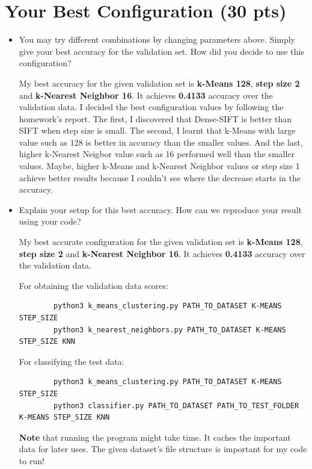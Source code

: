 \documentclass[12pt]{article}
\begin{document}
\section{Your Best Configuration (30 pts)}
    \begin{itemize}
        \item You may try different combinations by changing parameters above. Simply give your best accuracy for the validation set. How did you decide to use this configuration?
        
        My best accuracy for the given validation set is \textbf{k-Means 128}, \textbf{step size 2} and \textbf{k-Nearest Neighbor 16}. It achieves \textbf{0.4133} accuracy over the validation data. I decided the best configuration values by following the homework's report. The first, I discovered that Dense-SIFT is better than SIFT when step size is small. The second, I learnt that k-Means with large value such as 128 is better in accuracy than the smaller values. And the last, higher k-Nearest Neigbor value such as 16 performed well than the smaller values. Maybe, higher k-Means and k-Nearest Neighbor values or step size 1 achieve better results because I couldn't see where the decrease starts in the accuracy.
        
        \item Explain your setup for this best accuracy. How can we reproduce your result using your code?
        
        My best accurate configuration for the given validation set is \textbf{k-Means 128}, \textbf{step size 2} and \textbf{k-Nearest Neighbor 16}. It achieves \textbf{0.4133} accuracy over the validation data.
        
		For obtaining the validation data scores:        
        
		\begin{lstlisting}
		python3 k_means_clustering.py PATH_TO_DATASET K-MEANS STEP_SIZE
		python3 k_nearest_neighbors.py PATH_TO_DATASET K-MEANS STEP_SIZE KNN
		\end{lstlisting}
		
		For classifying the test data:
        
		\begin{lstlisting}
		python3 k_means_clustering.py PATH_TO_DATASET K-MEANS STEP_SIZE
		python3 classifier.py PATH_TO_DATASET PATH_TO_TEST_FOLDER K-MEANS STEP_SIZE KNN
		\end{lstlisting}
		
		\textbf{Note} that running the program might take time. It caches the important data for later uses. The given dataset's file structure is important for my code to run!
        

\end{itemize}
\end{document}
